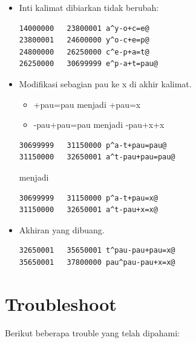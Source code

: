 \documentclass[12pt,]{article}
\begin{document}
\begin{itemize}
		\newpage
		\item Inti kalimat dibiarkan tidak berubah:
			\begin{verbatim}
14000000   23800001 a^y-o+c=e@
23800001   24600000 y^o-c+e=p@
24800000   26250000 c^e-p+a=t@
26250000   30699999 e^p-a+t=pau@
		\end{verbatim}

		\item Modifikasi sebagian pau ke x di akhir kalimat.\\
		\begin{itemize}
			\item +pau=pau menjadi +pau=x
			\item -pau+pau=pau menjadi -pau+x+x
		\end{itemize}

		\begin{verbatim}
30699999   31150000 p^a-t+pau=pau@
31150000   32650001 a^t-pau+pau=pau@
		\end{verbatim}

		menjadi

		\begin{verbatim}
30699999   31150000 p^a-t+pau=x@
31150000   32650001 a^t-pau+x=x@
		\end{verbatim}

		\item Akhiran yang dibuang.\\
		\begin{verbatim}
32650001   35650001 t^pau-pau+pau=x@
35650001   37800000 pau^pau-pau+x=x@
		\end{verbatim}

	\end{itemize}

	\newpage
	\mbox{}

	\newpage
	\section{Troubleshoot}
	Berikut beberapa trouble yang telah dipahami:
\end{document}
